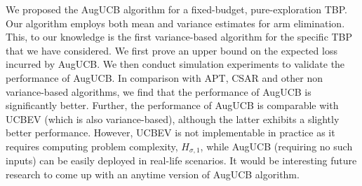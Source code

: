 We proposed the AugUCB algorithm for a fixed-budget, pure-exploration TBP. Our algorithm employs both mean and variance estimates for arm elimination. This, to our knowledge is the first variance-based algorithm for the specific TBP that we have considered. We first prove an upper bound on the expected loss incurred by AugUCB. We then conduct simulation experiments to validate the performance of AugUCB. In comparison with APT, CSAR and other non variance-based algorithms, we find that the performance of AugUCB is significantly better. Further, the performance of AugUCB is comparable with UCBEV (which is also variance-based), although the latter exhibits a slightly better performance.  However, UCBEV is not implementable in practice as it requires computing problem complexity, $H_{\sigma,1}$, while AugUCB (requiring no such inputs) can be easily deployed in real-life scenarios. It would be interesting future research to come up with an anytime version of AugUCB algorithm. 


